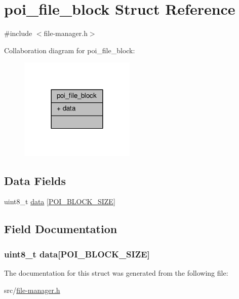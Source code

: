 \hypertarget{structpoi__file__block}{\section{poi\-\_\-file\-\_\-block Struct Reference}
\label{structpoi__file__block}
}


{\ttfamily \#include $<$file-\/manager.\-h$>$}



Collaboration diagram for poi\-\_\-file\-\_\-block\-:\nopagebreak
\begin{figure}[H]
\begin{center}
\leavevmode
\includegraphics[width=156pt]{structpoi__file__block__coll__graph}
\end{center}
\end{figure}
\subsection*{Data Fields}
\begin{DoxyCompactItemize}
\item 
uint8\-\_\-t \hyperlink{structpoi__file__block_a453580bb9858958a75d49cd9a450a4b3}{data} \mbox{[}\hyperlink{file-manager_8h_afb59af7070cf0cd010913eef940ffbbd}{P\-O\-I\-\_\-\-B\-L\-O\-C\-K\-\_\-\-S\-I\-Z\-E}\mbox{]}
\end{DoxyCompactItemize}


\subsection{Field Documentation}
\hypertarget{structpoi__file__block_a453580bb9858958a75d49cd9a450a4b3}{
\subsubsection[{data}]{\setlength{\rightskip}{0pt plus 5cm}uint8\-\_\-t data\mbox{[}{\bf P\-O\-I\-\_\-\-B\-L\-O\-C\-K\-\_\-\-S\-I\-Z\-E}\mbox{]}}}\label{structpoi__file__block_a453580bb9858958a75d49cd9a450a4b3}


The documentation for this struct was generated from the following file\-:\begin{DoxyCompactItemize}
\item 
src/\hyperlink{file-manager_8h}{file-\/manager.\-h}\end{DoxyCompactItemize}
